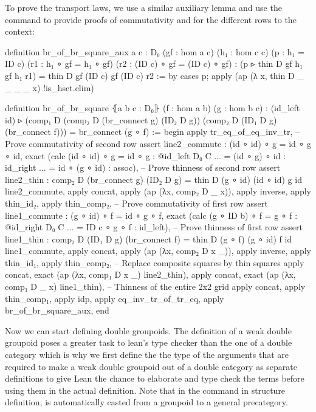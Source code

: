 To prove the transport laws, we use a similar auxiliary lemma and use the
 command to provide proofs of commutativity and  for the different
rows to the context:
\begin{leancodebr}
  definition br_of_br_square_aux {a c : D₀} (gf : hom a c)
    (h₁ : hom c c) (p : h₁ = ID c)
    (r1 : h₁ ∘ gf = h₁ ∘ gf) (r2 : (ID c) ∘ gf = (ID c) ∘ gf) :
    (p ▹ thin D gf h₁ gf h₁ r1) = thin D gf (ID c) gf (ID c) r2 :=
  by cases p; apply (ap (λ x, thin D _ _ _ _ x) !is_hset.elim)

  definition br_of_br_square ⦃a b c : D₀⦄ (f : hom a b) (g : hom b c) :
    (id_left id) ▹ (comp₁ D (comp₂ D (br_connect g) (ID₂ D g))
      (comp₂ D (ID₁ D g) (br_connect f)))
    = br_connect (g ∘ f) :=
  begin
    apply tr_eq_of_eq_inv_tr,
    -- Prove commutativity of second row
    assert line2_commute : (id ∘ id) ∘ g = id ∘ g ∘ id,
      exact (calc (id ∘ id) ∘ g = id ∘ g : @id_left D₀ C
                           ... = (id ∘ g) ∘ id : id_right
                           ... = id ∘ (g ∘ id) : assoc),
    -- Prove thinness of second row
    assert line2_thin : comp₂ D (br_connect g) (ID₂ D g)
      = thin D (g ∘ id) (id ∘ id) g id line2_commute,
      apply concat, apply (ap (λx, comp₂ D _ x)), apply inverse, apply thin_id₂,
      apply thin_comp₂,
    -- Prove commutativity of first row
    assert line1_commute : (g ∘ id) ∘ f = id ∘ g ∘ f,
      exact (calc (g ∘ ID b) ∘ f = g ∘ f : @id_right D₀ C
                            ... = ID c ∘ g ∘ f : id_left),
    -- Prove thinness of first row
    assert line1_thin : comp₂ D (ID₁ D g) (br_connect f)
      = thin D (g ∘ f) (g ∘ id) f id line1_commute,
      apply concat, apply (ap (λx, comp₂ D x _)), apply inverse, apply thin_id₁,
      apply thin_comp₂,
    -- Replace composite squares by thin squares
    apply concat, exact (ap (λx, comp₁ D x _) line2_thin),
    apply concat, exact (ap (λx, comp₁ D _ x) line1_thin),
    -- Thinness of the entire 2x2 grid
    apply concat, apply thin_comp₁, apply idp,
    apply eq_inv_tr_of_tr_eq,
    apply br_of_br_square_aux,
  end
\end{leancodebr}

Now we can start defining double groupoids.
The definition of a weak double groupoid poses a greater task to lean's type
checker than the one of a double category which is why we first define the the
type of the arguments that are required to make a weak double groupoid out of a
double category as separate definitions to give Lean the chance to elaborate
and type check the terms before using them in the actual definition.
Note that in the  command in structure definition,  is
automatically casted from a groupoid to a general precategory.

